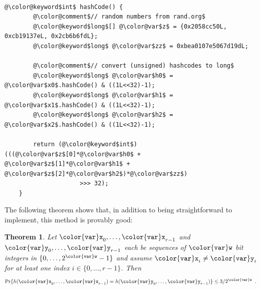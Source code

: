 \documentclass[10pt]{book}
\newcommand{\pcodeimport}[1]{}
\theoremstyle{plain}
\newtheorem{thm}{Theorem}[chapter]
\newcommand{\thmlabel}[1]{\label{thm:#1}}
\theoremstyle{definition}
\begin{document}
 \ \vspace{.5ex}\begin{Verbatim}[gobble=1,tabsize=2,frame=single,framerule=1.2pt,commandchars=\\@\$,label=\texttt{Point3D},labelposition=topline]
	@\color@keyword$int$ hashCode() {
		@\color@comment$// random numbers from rand.org$
		@\color@keyword$long$[] @\color@var$z$ = {0x2058cc50L, 0xcb19137eL, 0x2cb6b6fdL}; 
		@\color@keyword$long$ @\color@var$zz$ = 0xbea0107e5067d19dL;

		@\color@comment$// convert (unsigned) hashcodes to long$
		@\color@keyword$long$ @\color@var$h0$ = @\color@var$x0$.hashCode() & ((1L<<32)-1);
		@\color@keyword$long$ @\color@var$h1$ = @\color@var$x1$.hashCode() & ((1L<<32)-1);
		@\color@keyword$long$ @\color@var$h2$ = @\color@var$x2$.hashCode() & ((1L<<32)-1);
		
		return (@\color@keyword$int$)(((@\color@var$z$[0]*@\color@var$h0$ + @\color@var$z$[1]*@\color@var$h1$ + @\color@var$z$[2]*@\color@var$h2$)*@\color@var$zz$)
		             >>> 32);
	}
\end{Verbatim}

\pcodeimport{ods/Point3d.hashCode()}
The following theorem shows that, in addition to being straightforward to implement, this method is provably good:

\begin{thm}\thmlabel{multihash}
Let $\ensuremath{\mathtt{{\color{var}x}}}_0,\ldots,\ensuremath{\mathtt{{\color{var}x}}}_{r-1}$ and $\ensuremath{\mathtt{{\color{var}y}}}_0,\ldots,\ensuremath{\mathtt{{\color{var}y}}}_{r-1}$ each be sequences of \ensuremath{\mathtt{{\color{var}w}}} bit integers in $\{0,\ldots,2^{\ensuremath{\mathtt{{\color{var}w}}}}-1\}$ and assume $\ensuremath{\mathtt{{\color{var}x}}}_i \neq \ensuremath{\mathtt{{\color{var}y}}}_i$ for at least one index $i\in\{0,\ldots,r-1\}$. Then 
\[
   \Pr\{ h(\ensuremath{\mathtt{{\color{var}x}}}_0,\ldots,\ensuremath{\mathtt{{\color{var}x}}}_{r-1}) =  h(\ensuremath{\mathtt{{\color{var}y}}}_0,\ldots,\ensuremath{\mathtt{{\color{var}y}}}_{r-1}) \} 
        \le 3/2^{\ensuremath{\mathtt{{\color{var}w}}}} \enspace .  
\] 
\end{thm}
\end{document}

